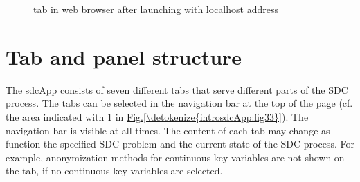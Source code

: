 \documentclass[letterpaper,10pt,english]{sphinxmanual}
\begin{document}
\begin{figure}[htbp]
\centering
\capstart

\noindent{}
\caption{ tab in web browser after launching  with localhost address}\label{\detokenize{introsdcApp:fig32}}\label{\detokenize{introsdcApp:id2}}\end{figure}


\section{Tab and panel structure}
\label{\detokenize{introsdcApp:tab-and-panel-structure}}
The sdcApp consists of seven different tabs that serve different parts of the
SDC process. The tabs can be selected in the navigation
bar at the top of the page (cf. the area indicated with 1 in \hyperref[\detokenize{introsdcApp:fig33}]{Fig.\@ \ref{\detokenize{introsdcApp:fig33}}}).
The navigation bar is visible at all times. The content of each tab may change as
function the specified SDC problem and the current state of the SDC process. For example,
anonymization methods for continuous key variables are not shown on the  tab,
if no continuous key variables are selected.
\end{document}
